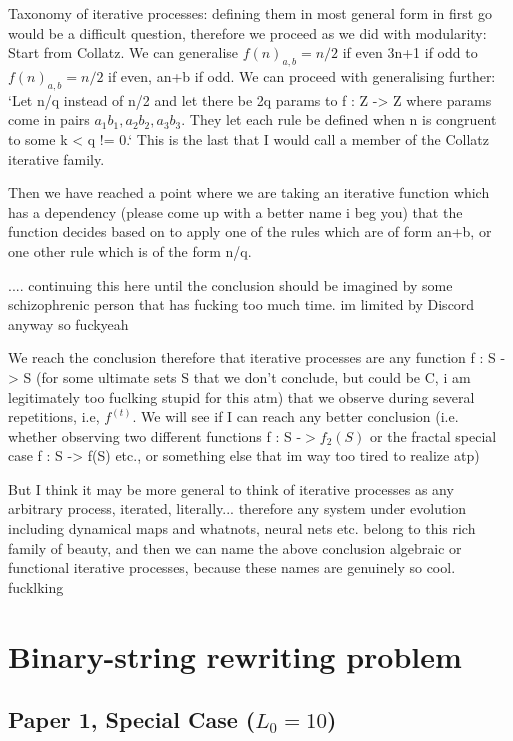 \documentclass[a4paper]{article}
\theoremstyle{plain}
\theoremstyle{definition}
\theoremstyle{remark}
\begin{document}
Taxonomy of iterative processes: defining them in most general form in first go would be a difficult question, therefore we proceed as we did with modularity:
Start from Collatz. We can generalise $f(n)_{a,b} = n/2$ if even 3n+1 if odd to $f(n)_{a,b} = n/2$ if even, an+b if odd.
We can proceed with generalising further: `Let n/q instead of n/2 and let there be 2q params to f : Z -> Z where params come in pairs $a_1 b_1, a_2 b_2, a_3 b_3$. They let each rule be defined when n is congruent to some k < q != 0.` This is the last that I would call a member of the Collatz iterative family.

Then we have reached a point where we are taking an iterative function which has a dependency (please come up with a better name i beg you) that the function decides based on to apply one of the rules which are of form an+b, or one other rule which is of the form n/q. 

.... continuing this here until the conclusion should be imagined by some schizophrenic person that has fucking too much time. im limited by Discord anyway so fuckyeah

We reach the conclusion therefore that iterative processes are any function f : S -> S (for some ultimate sets S that we don't conclude, but could be C, i am legitimately too fuclking stupid for this atm) that we observe during several repetitions, i.e, $f^{(t)}$. We will see if I can reach any better conclusion (i.e. whether observing two different functions f : S -$> f_{2}(S)$ or  the fractal special case f : S -> f(S) etc., or something else that im way too tired to realize atp)

But I think it may be more general to think of iterative processes as any arbitrary process, iterated, literally... therefore any system under evolution including dynamical maps and whatnots, neural nets etc. belong to this rich family of beauty, and then we can name the above conclusion algebraic or functional iterative processes, because these names are genuinely so cool. fucklking


\section{Binary-string rewriting problem}

\subsection{Paper 1, Special Case ($L_0 = 10$)}
\end{document}
